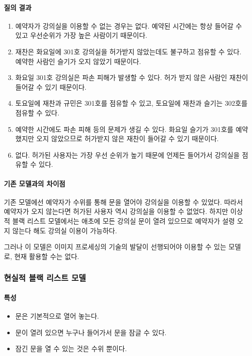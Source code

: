 \documentclass[11pt,a4paper]{article}
\begin{document}
\paragraph{질의 결과}
\begin{enumerate}
\item 예약자가 강의실을 이용할 수 없는 경우는 없다. 예약된 시간에는 항상 들어갈
수 있고 우선순위가 가장 높은 사람이기 때문이다.
\item 재찬은 화요일에 301호 강의실을 허가받지 않았는데도 불구하고 점유할 수
있다. 예약한 사람인 슬기가 오지 않았기 때문이다.
\item 화요일 301호 강의실은 파손 피해가 발생할 수 있다. 허가 받지 않은 사람인
재찬이 들어갈 수 있기 때문이다.
\item 토요일에 재찬과 규민은 301호를 점유할 수 있고, 토요일에 재찬과 슬기는
302호를 점유할 수 있다.
\item 예약한 시간에도 파손 피해 등의 문제가 생길 수 있다. 화요일 슬기가 301호를
예약했지만 오지 않았으므로 허가받지 않은 재찬이 들어갈 수 있기 때문이다.
\item 없다. 허가된 사용자는 가장 우선 순위가 높기 때문에 언제든 들어가서
강의실을 점유할 수 있다.
\end{enumerate}

\paragraph{기존 모델과의 차이점}
\hfill\break
\indent
기존 모델에선 예약자가 수위를 통해 문을 열어야 강의실을 이용할 수 있었다.
따라서 예약자가 오지 않는다면 허가된 사용자 역시 강의실을 이용할 수 없었다.
하지만 이상적 블랙 리스트 모델에서는 애초에 모든 강의실 문이 열려 있으므로
예약자가 설령 오지 않는다 해도 강의실 이용이 가능하다.

그러나 이 모델은 이미지 프로세싱의 기술의 발달이 선행되어야 이용할 수 있는
모델로, 현재 활용할 수는 없다.

\subsubsection{현실적 블랙 리스트 모델}

\paragraph{특성}
\begin{itemize}
\item 문은 기본적으로 열어 놓는다.
\item 문이 열려 있으면 누구나 들어가서 문을 잠글 수 있다.
\item 잠긴 문을 열 수 있는 것은 수위 뿐이다.
\end{itemize}
\end{document}
